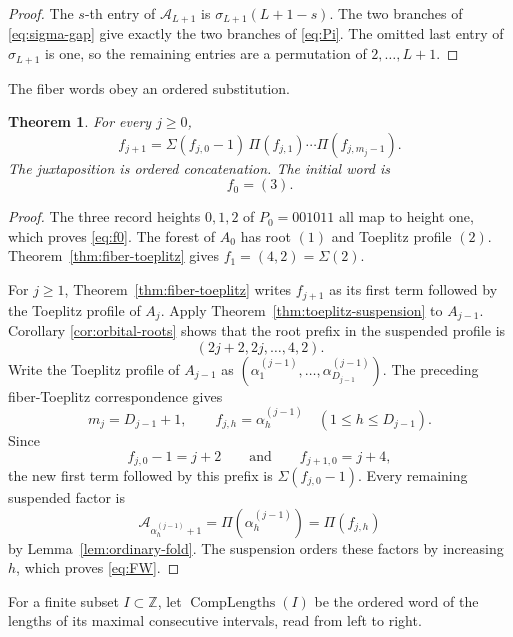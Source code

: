 \documentclass[11pt]{article}
\newtheorem{theorem}{Theorem}[section]
\theoremstyle{definition}
\theoremstyle{remark}
\begin{document}
\begin{proof}
The \(s\)-th entry of \(\mathcal A_{L+1}\) is
\(\sigma_{L+1}(L+1-s)\).  The two branches of
\eqref{eq:sigma-gap} give exactly the two branches of \eqref{eq:Pi}.
The omitted last entry of \(\sigma_{L+1}\) is one, so the remaining entries
are a permutation of \(2,\ldots,L+1\).
\end{proof}

The fiber words obey an ordered substitution.
\begin{theorem}
\label{thm:FW}
For every \(j\geq0\),
\begin{equation}
\label{eq:FW}
 f_{j+1}
 =\Sigma(f_{j,0}-1)\,
  \Pi(f_{j,1})\cdots\Pi(f_{j,m_j-1}).
\end{equation}
The juxtaposition is ordered concatenation.  The initial word is
\begin{equation}
\label{eq:f0}
 f_0=(3).
\end{equation}
\end{theorem}

\begin{proof}
The three record heights \(0,1,2\) of \(P_0=001011\) all map to height one,
which proves \eqref{eq:f0}.  The forest of \(A_0\) has root \((1)\) and
Toeplitz profile \((2)\).  Theorem~\ref{thm:fiber-toeplitz} gives
\(f_1=(4,2)=\Sigma(2)\).

For \(j\geq1\), Theorem~\ref{thm:fiber-toeplitz} writes \(f_{j+1}\) as its
first term followed by the Toeplitz profile of \(A_j\).  Apply
Theorem~\ref{thm:toeplitz-suspension} to \(A_{j-1}\).  Corollary
\ref{cor:orbital-roots} shows that the root prefix in the suspended profile
is
\[
 (2j+2,2j,\ldots,4,2).
\]
Write the Toeplitz profile of \(A_{j-1}\) as
\((\alpha^{(j-1)}_1,\ldots,\alpha^{(j-1)}_{D_{j-1}})\).  The preceding
fiber-Toeplitz correspondence gives
\[
 m_j=D_{j-1}+1,
 \qquad
 f_{j,h}=\alpha^{(j-1)}_h
 \quad(1\leq h\leq D_{j-1}).
\]
Since
\[
 f_{j,0}-1=j+2
 \qquad\text{and}\qquad
 f_{j+1,0}=j+4,
\]
the new first term followed by this prefix is
\(\Sigma(f_{j,0}-1)\).  Every remaining suspended factor is
\[
 \mathcal A_{\alpha^{(j-1)}_h+1}
 =\Pi(\alpha^{(j-1)}_h)=\Pi(f_{j,h})
\]
by Lemma~\ref{lem:ordinary-fold}.  The suspension orders these factors by
increasing \(h\), which proves \eqref{eq:FW}.
\end{proof}

For a finite subset \(I\subset\mathbb Z\), let
\(\operatorname{CompLengths}(I)\) be the ordered word of the lengths of its
maximal consecutive intervals, read from left to right.
\end{document}
